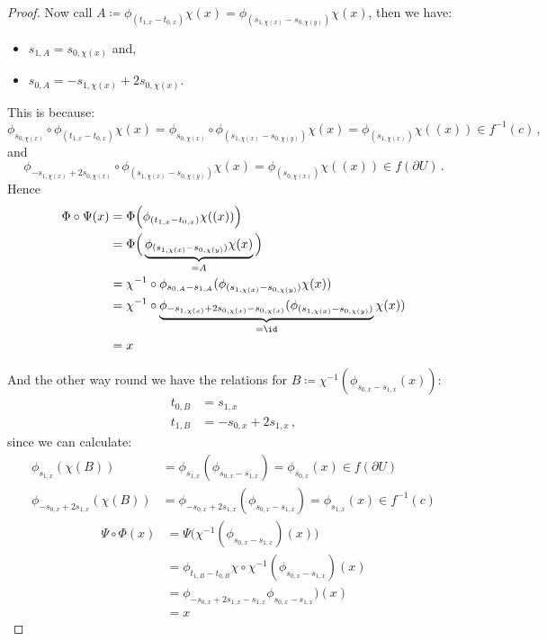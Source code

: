 \begin{proof}
Now call $A\coloneq  \phi_{(t_{1,x}-t_{0,x})}\chi(x)=\phi_{(s_{1,\chi(x)}-s_{0,\chi(y)})}\chi(x)$, then we have:
\begin{itemize}
	\item $s_{1,A}=s_{0,\chi(x)}$ and,
	\item $s_{0,A}=-s_{1,\chi(x)}+2s_{0,\chi(x)}$.
\end{itemize}
This is because:
\begin{equation*}
		\phi_{s_{0,\chi(x)}}\circ \phi_{(t_{1,x}-t_{0,x})}\chi(x)=\phi_{s_{0,\chi(x)}}\circ  \phi_{(s_{1,\chi(x)}-s_{0,\chi(y)})}\chi(x)= \phi_{(s_{1,\chi(x)})}\chi((x)) \in f^{-1}(c)\, ,
\end{equation*} 
and 
\begin{equation*}
	\phi_{-s_{1,\chi(x)}+2s_{0,\chi(x)}}\circ \phi_{(s_{1,\chi(x)}-s_{0,\chi(y)})}\chi(x)= \phi_{(s_{0,\chi(x)})}\chi((x)) \in f(\partial U)\, .
\end{equation*} 
Hence  
\begin{align*}
	\Phi \circ \Psi(x)
	&= 	\Phi\Big( \phi_{(t_{1,x}-t_{0,x})}\chi((x)) \Big) \\
	&= 	\Phi\Big( \underbrace{\phi_{(s_{1,\chi(x)}-s_{0,\chi(y)})}\chi(x)}_{=A} \Big) \\
	&=  \chi^{-1}\circ \phi_{s_{0,A}-s_{1,A}}(\phi_{(s_{1,\chi(x)}-s_{0,\chi(y)})}\chi(x)) \\
	&=  \chi^{-1}\circ \underbrace{\phi_{-s_{1,\chi(x)}+2s_{0,\chi(x)} -s_{0,\chi(x)} }(\phi_{(s_{1,\chi(x)}-s_{0,\chi(y)})}}_{=\id}\chi(x)) \\
	&=  x
\end{align*}

And the other way round we have the relations for $B\coloneq \chi^{-1}(\phi_{s_{0,x}-s_{1,x}}(x))$:
\begin{align*}
t_{0,B}&=	s_{1,x}\\
t_{1,B}&=	-s_{0,x}+2s_{1,x}\, , 
\end{align*}
since we can calculate:
\begin{align*}
	\phi_{s_{1,x}}(\chi(B))			  &= \phi_{s_{1,x}}(\phi_{s_{0,x}-s_{1,x}})=\phi_{s_{0,x}}(x)\in f(\partial U)\\
	\phi_{-s_{0,x}+2s_{1,x}}(\chi(B)) &= \phi_{-s_{0,x}+2s_{1,x}}(\phi_{s_{0,x}-s_{1,x}})= \phi_{s_{1,x}}(x) \in f^{-1}(c)
\end{align*}
\begin{align*}
	\Psi\circ \Phi(x)
	&=	\Psi \big( \chi^{-1}(\phi_{s_{0,x}-s_{1,x}})(x) \big)  \\
	&=	\phi_{t_{1,B}-t_{0,B}}\chi \circ \chi^{-1}(\phi_{s_{0,x}-s_{1,x}})(x) \\
	&=  \phi_{	-s_{0,x}+2s_{1,x}-s_{1,x}}\phi_{s_{0,x}-s_{1,x}})(x) \\
	&=  x
\end{align*}


\end{proof}
